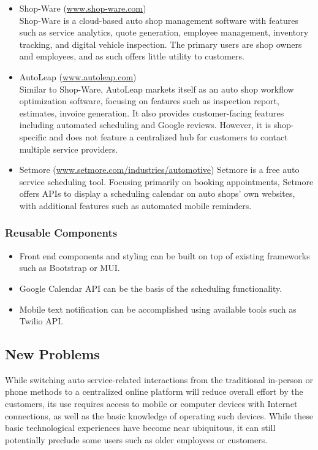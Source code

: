 \documentclass[12pt]{article}
\begin{document}
\begin {itemize}
    \item Shop-Ware (\url{www.shop-ware.com}) \\ 
    Shop-Ware is a cloud-based auto shop management software with features such 
    as service analytics, quote generation, employee management, inventory 
    tracking, and digital vehicle inspection. The primary users are shop owners 
    and employees, and as such offers little utility to customers.
    
    \item AutoLeap (\url{www.autoleap.com}) \\
    Similar to Shop-Ware, AutoLeap markets itself as an auto shop workflow 
    optimization software, focusing on features such as inspection report, 
    estimates, invoice generation. It also provides customer-facing features 
    including automated scheduling and Google reviews. However, it is 
    shop-specific and does not feature a centralized hub for customers to 
    contact multiple service providers.
    
    \item Setmore (\url{www.setmore.com/industries/automotive})
    Setmore is a free auto service scheduling tool. Focusing primarily on 
    booking appointments, Setmore offers APIs to display a scheduling calendar 
    on auto shops' own websites, with additional features such as automated 
    mobile reminders. 
\end {itemize}

\subsubsection{Reusable Components}
    \begin{itemize}
        \item Front end components and styling can be built on top of existing 
        frameworks such as Bootstrap or MUI.
        \item Google Calendar API can be the basis of the scheduling 
        functionality.
        \item Mobile text notification can be accomplished using available 
        tools such as Twilio API.
    \end{itemize}

\subsection{New Problems}
While switching auto service-related interactions from the traditional 
in-person or phone methods to a centralized online platform will reduce overall 
effort by the customers, its use requires access to mobile or computer devices 
with Internet connections, as well as the basic knowledge of operating such 
devices. While these basic technological experiences have become near 
ubiquitous, it can still potentially preclude some users such as older 
employees or customers.
\end{document}
